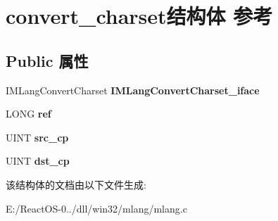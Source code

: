 \hypertarget{structconvert__charset}{}\section{convert\+\_\+charset结构体 参考}
\label{structconvert__charset}
\subsection*{Public 属性}
\begin{DoxyCompactItemize}
\item 
\mbox{\label{structconvert__charset_ae773802703621e9658b14172f61cf7e3}} 
I\+M\+Lang\+Convert\+Charset {\bfseries I\+M\+Lang\+Convert\+Charset\+\_\+iface}
\item 
\mbox{\label{structconvert__charset_ad03f28af51852a4a1ddde96de81071f4}} 
L\+O\+NG {\bfseries ref}
\item 
\mbox{\label{structconvert__charset_a358677aa2981277b95e97df35b49ef90}} 
U\+I\+NT {\bfseries src\+\_\+cp}
\item 
\mbox{\label{structconvert__charset_a17e63e7e7c2cae6484cb5de3453933fb}} 
U\+I\+NT {\bfseries dst\+\_\+cp}
\end{DoxyCompactItemize}


该结构体的文档由以下文件生成\+:\begin{DoxyCompactItemize}
\item 
E\+:/\+React\+O\+S-\/0../dll/win32/mlang/mlang.\+c\end{DoxyCompactItemize}
